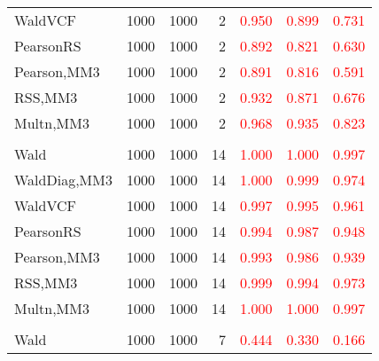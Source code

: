 \documentclass[
]{article}
\begin{document}
\begin{table}[H]
{\begin{tabular}[t]{lrrrrrr}
\hspace{1em}WaldVCF & 1000 & 1000 & 2 & \textcolor{red}{0.950} & \textcolor{red}{0.899} & \textcolor{red}{0.731}\\
\hspace{1em}PearsonRS & 1000 & 1000 & 2 & \textcolor{red}{0.892} & \textcolor{red}{0.821} & \textcolor{red}{0.630}\\
\hspace{1em}Pearson,MM3 & 1000 & 1000 & 2 & \textcolor{red}{0.891} & \textcolor{red}{0.816} & \textcolor{red}{0.591}\\
\hspace{1em}RSS,MM3 & 1000 & 1000 & 2 & \textcolor{red}{0.932} & \textcolor{red}{0.871} & \textcolor{red}{0.676}\\
\hspace{1em}Multn,MM3 & 1000 & 1000 & 2 & \textcolor{red}{0.968} & \textcolor{red}{0.935} & \textcolor{red}{0.823}\\
\addlinespace[0.3em]
\multicolumn{7}{l}{\textbf{1F 15V}}\\
\hspace{1em}Wald & 1000 & 1000 & 14 & \textcolor{red}{1.000} & \textcolor{red}{1.000} & \textcolor{red}{0.997}\\
\hspace{1em}WaldDiag,MM3 & 1000 & 1000 & 14 & \textcolor{red}{1.000} & \textcolor{red}{0.999} & \textcolor{red}{0.974}\\
\hspace{1em}WaldVCF & 1000 & 1000 & 14 & \textcolor{red}{0.997} & \textcolor{red}{0.995} & \textcolor{red}{0.961}\\
\hspace{1em}PearsonRS & 1000 & 1000 & 14 & \textcolor{red}{0.994} & \textcolor{red}{0.987} & \textcolor{red}{0.948}\\
\hspace{1em}Pearson,MM3 & 1000 & 1000 & 14 & \textcolor{red}{0.993} & \textcolor{red}{0.986} & \textcolor{red}{0.939}\\
\hspace{1em}RSS,MM3 & 1000 & 1000 & 14 & \textcolor{red}{0.999} & \textcolor{red}{0.994} & \textcolor{red}{0.973}\\
\hspace{1em}Multn,MM3 & 1000 & 1000 & 14 & \textcolor{red}{1.000} & \textcolor{red}{1.000} & \textcolor{red}{0.997}\\
\addlinespace[0.3em]
\multicolumn{7}{l}{\textbf{2F 10V}}\\
\hspace{1em}Wald & 1000 & 1000 & 7 & \textcolor{red}{0.444} & \textcolor{red}{0.330} & \textcolor{red}{0.166}\\

\end{tabular}}
\end{table}
\end{document}
